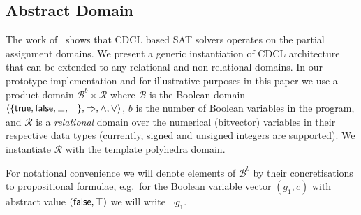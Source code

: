 
\subsection{Abstract Domain}
The work of~\cite{sas12,dhk2013-popl} shows that CDCL based SAT solvers 
operates on the partial assignment domains. We present a generic instantiation 
of CDCL architecture that can be extended to any relational and non-relational
domains.  
% 
In our prototype implementation and for illustrative purposes in this
paper we use a product domain $\mathcal{B}^b\times\mathcal{R}$ where
$\mathcal{B}$ is the Boolean domain
$\langle\{\mathsf{true},\mathsf{false},\bot,\top\},\Rightarrow,\wedge,\vee\rangle$, 
$b$ is the number of Boolean variables in the program, 
and $\mathcal{R}$ is a \emph{relational} domain over the 
numerical (bitvector) variables in their respective
data types (currently, signed and unsigned integers are supported).
%
We instantiate $\mathcal{R}$ with the template polyhedra domain.

For notational convenience we will denote elements of
$\mathcal{B}^b$ by their concretisations to propositional formulae,
e.g.\ for the Boolean variable vector $(g_1,c)$ with abstract value
$(\mathsf{false},\top)$ we will write $\neg g_1$.

